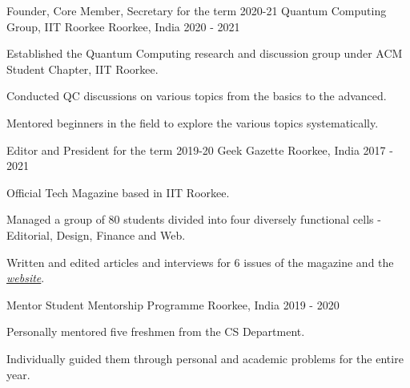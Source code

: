 

\begin{cventries}
  \cventry
    {Founder, Core Member, Secretary for the term 2020-21} %
    {Quantum Computing Group, IIT Roorkee} %
    {Roorkee, India} %
    {2020 - 2021} %
    {
      \begin{cvitems} %
        \item {Established the Quantum Computing research and discussion group under ACM Student Chapter, IIT Roorkee.}
        \item {Conducted QC discussions on various topics from the basics to the advanced.}
        \item {Mentored beginners in the field to explore the various topics systematically.}
    \end{cvitems}
    }

  \cventry
    {Editor and President for the term 2019-20} %
    {Geek Gazette} %
    {Roorkee, India} %
    {2017 - 2021} %
    {
      \begin{cvitems} %
        \item {Official Tech Magazine based in IIT Roorkee.}
        \item {Managed a group of 80 students divided into four diversely functional cells - Editorial, Design, Finance and Web.}
        \item {Written and edited articles and interviews for 6 issues of the magazine and the \emph{\href{https://geekgazette.iitr.ac.in}{website}}.}
      \end{cvitems}
    }

  \cventry
    {Mentor} %
    {Student Mentorship Programme} %
    {Roorkee, India} %
    {2019 - 2020} %
    {
      \begin{cvitems} %
        \item {Personally mentored five freshmen from the CS Department.}
        \item {Individually guided them through personal and academic problems for the entire year.}
      \end{cvitems}
    }


\end{cventries}
